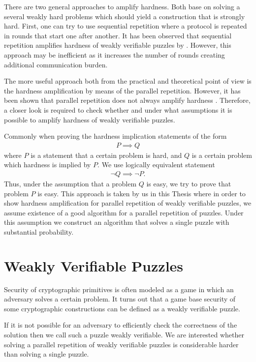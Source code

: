 \documentclass[11pt,a4paper,titlepage]{memoir}
\begin{document}
There are two general approaches to amplify hardness. Both base on solving a several weakly hard problems which should yield a construction that is strongly hard.
First, one can try to use sequential repetition where a protocol is repeated in rounds that start one after another.
It has been observed that sequential repetition amplifies hardness of weakly verifiable puzzles by \cite{von2003captcha}.
However, this approach may be inefficient as it increases the number of rounds creating additional communication burden.

The more useful approach both from the practical and theoretical point of view is the hardness amplification by means of the
parallel repetition. However, it has been shown that parallel repetition does not always amplify hardness \cite{bellare1997does}.
Therefore, a closer look is required to check whether and under what assumptions it is possible to amplify hardness of weakly verifiable puzzles.

Commonly when proving the hardness implication statements of the form
\begin{align*}
  P \implies Q
\end{align*}
where $P$ is a statement that a certain problem is hard, and $Q$ is a certain problem which hardness is implied by $P$.
We use logically equivalent statement
\begin{align*}
  \lnot Q \implies \lnot P.
\end{align*}
Thus, under the assumption that a problem $Q$ is easy, we try to prove that problem $P$ is easy.
This approach is taken by us in this Thesis where in order to show hardness amplification for parallel repetition of weakly verifiable puzzles,
we assume existence of a good algorithm for a parallel repetition of puzzles.
Under this assumption we construct an algorithm that solves a single puzzle with substantial probability.

\section{Weakly Verifiable Puzzles}
Security of cryptographic primitives is often modeled as a game in which an adversary solves a certain problem.
It turns out that a game base security of some cryptographic constructions can be defined as a weakly verifiable puzzle.

If it is not possible for an adversary to efficiently check the correctness of the solution then
we call such a puzzle weakly verifiable. We are interested whether solving a parallel repetition of weakly verifiable puzzles
is considerable harder than solving a single puzzle.
\end{document}
